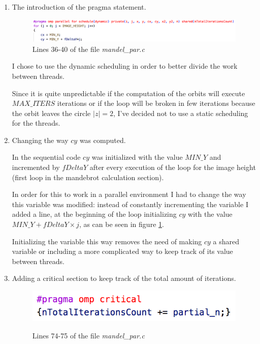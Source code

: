 \documentclass[unicode,11pt,a4paper,oneside,numbers=endperiod,openany]{scrartcl}
\begin{document}
    \begin{enumerate}

        \item The introduction of the pragma statement.

            \begin{figure}[H]
                \includegraphics[width=0.9\linewidth]{mandel-par}
                \caption{Lines 36-40 of the file \textit{mandel\_par.c}}
                \label{fig:mandel-par}
            \end{figure}

            I chose to use the dynamic scheduling in order to better divide the work between threads.

            Since it is quite unpredictable if the computation of the orbits will execute $MAX\_ITERS$ iterations or if the loop will be broken in few iterations because the orbit leaves the circle $|z| = 2$, I've decided not to use a static scheduling for the threads.

        \item Changing the way $cy$ was computed.

            In the sequential code $cy$ was initialized with the value $MIN\_Y$ and incremented by $fDeltaY$ after every execution of the loop for the image height (first loop in the mandebrot calculation section).

            In order for this to work in a parallel environment I had to change the way this variable was modified: instead of constantly incrementing the variable I added a line, at the beginning of the loop initializing $cy$ with the value $MIN\_Y + fDeltaY\times j$, as can be seen in figure \ref{fig:mandel-par}.

            Initializing the variable this way removes the need of making $cy$ a shared variable or including a more complicated way to keep track of its value between threads.

        \item Adding a critical section to keep track of the total amount of iterations.

            \begin{figure}[H]
                \centering
                \includegraphics[width=0.7\linewidth]{critical-mandel-par}
                \label{critical-mandel-par}
                \caption{Lines 74-75 of the file \textit{mandel\_par.c}}
            \end{figure}


\end{enumerate}
\end{document}
